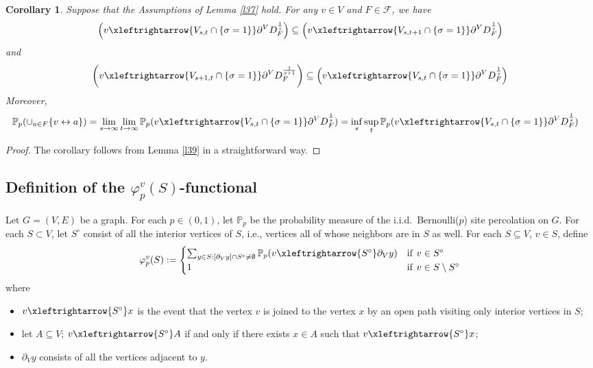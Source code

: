\documentclass[11pt]{amsart}
\theoremstyle{plain}
\newtheorem{corollary}[theorem]{Corollary}
\numberwithin{equation}{section}
\numberwithin{figure}{section}
\newcommand\PP{{\mathbb P}}
\begin{document}
\begin{corollary}\label{c310}Suppose that the Assumptions of Lemma \ref{l37} hold. For any $v\in V$ and $F\in \mathcal{F}$, we have
\begin{align}
\label{ti}\left(v\xleftrightarrow{V_{s,t}\cap\{\sigma=1\}} \partial^V D_{F}^{\frac{1}{s}}\right)\subseteq \left(v\xleftrightarrow{V_{s,t+1}\cap\{\sigma=1\}} \partial^V D_{F}^{\frac{1}{s}}\right)
\end{align}
and 
\begin{align}
\label{sd}\left(v\xleftrightarrow{V_{s+1,t}\cap\{\sigma=1\}} \partial^V D_{F}^{\frac{1}{s+1}}\right)\subseteq \left(v\xleftrightarrow{V_{s,t}\cap\{\sigma=1\}} \partial^V D_{F}^{\frac{1}{s}}\right)
\end{align}
Moreover,
\begin{align}
\PP_p(\cup_{a\in  F}\{v\leftrightarrow a\})&=\lim_{s\rightarrow\infty}\lim_{t\rightarrow\infty}\PP_p(v\xleftrightarrow{V_{s,t}\cap\{\sigma=1\}} \partial^V D_{F}^{\frac{1}{s}})\label{llst}=\inf_{s}\sup_t \PP_p(v\xleftrightarrow{V_{s,t}\cap\{\sigma=1\}} \partial^V D_{F}^{\frac{1}{s}})
\end{align}
\end{corollary}

\begin{proof}The corollary follows from Lemma \ref{l39} in a straightforward way.
\end{proof}

\subsection{Definition of the $\varphi_p^v(S)$-functional}

Let $G=(V,E)$ be a graph. For each $p\in (0,1)$, let $\mathbb{P}_p$ be the probability measure of the i.i.d.~Bernoulli($p$) site percolation on $G$.
For each $S\subset V$, let $S^{\circ}$ consist of all the interior vertices of $S$, i.e., vertices all of whose neighbors are in $S$ as well.
For each  $S\subseteq V$, $v\in S$, define
\begin{align}
\varphi_p^{v}(S):=\begin{cases}\sum_{y\in S:[\partial_V y]\cap S^c\neq\emptyset}\mathbb{P}_p(v\xleftrightarrow{S^{\circ}} \partial_V y)&\mathrm{if}\ v\in S^{\circ}\\
1&\mathrm{if}\ v\in S\setminus S^{\circ}
\end{cases}\label{dpv}
\end{align}
where 
\begin{itemize}
\item $v\xleftrightarrow{S^{\circ}} x$ is the event that the vertex $v$ is joined to the vertex $x$ by an open path visiting only interior vertices in $S$;
\item let $A\subseteq V$; $v\xleftrightarrow{S^{\circ}} A$ if and only if there exists $x\in A$ such that $v\xleftrightarrow{S^{\circ}} x$;
\item $\partial_V y$ consists of all the vertices adjacent to $y$.
\end{itemize}
\end{document}
